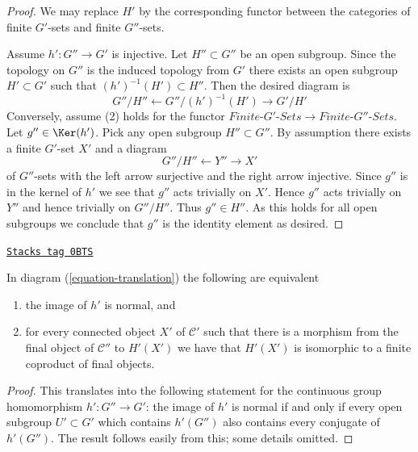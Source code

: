 \begin{proof}
We may replace $H'$ by the corresponding functor between the categories
of finite $G'$-sets and finite $G''$-sets.

\medskip\noindent
Assume $h' : G'' \to G'$ is injective. Let $H'' \subset G''$
be an open subgroup. Since the topology on $G''$ is the induced
topology from $G'$ there exists an open subgroup $H' \subset G'$
such that $(h')^{-1}(H') \subset H''$.
Then the desired diagram is
$$
G''/H'' \leftarrow G''/(h')^{-1}(H') \rightarrow G'/H'
$$
Conversely, assume (2) holds for the functor
$\textit{Finite-}G'\textit{-Sets} \to \textit{Finite-}G''\textit{-Sets}$.
Let $g'' \in \Ker(h')$. Pick any open subgroup $H'' \subset G''$.
By assumption there exists a finite $G'$-set $X'$ and a diagram
$$
G''/H'' \leftarrow Y'' \rightarrow X'
$$
of $G''$-sets with the left arrow surjective and the right arrow injective.
Since $g''$ is in the kernel of $h'$ we see that $g''$ acts trivially on $X'$.
Hence $g''$ acts trivially on $Y''$ and hence trivially on $G''/H''$.
Thus $g'' \in H''$. As this holds for all open subgroups we conclude
that $g''$ is the identity element as desired.
\end{proof}

\begin{lemma}
\label{pione-lemma-functoriality-galois-normal}
\href{https://stacks.math.columbia.edu/tag/0BTS}{\texttt{Stacks tag 0BTS}}

In diagram (\ref{equation-translation}) the following are equivalent
\begin{enumerate}
\item the image of $h'$ is normal, and
\item for every connected object $X'$ of $\mathcal{C}'$ such that
there is a morphism from the final object of $\mathcal{C}''$
to $H'(X')$ we have that $H'(X')$ is isomorphic to a finite coproduct
of final objects.
\end{enumerate}
\end{lemma}

\begin{proof}
This translates into the following statement for the continuous
group homomorphism $h' : G'' \to G'$: the image of $h'$ is normal
if and only if every open subgroup $U' \subset G'$ which
contains $h'(G'')$ also contains every conjugate of $h'(G'')$.
The result follows easily from this; some details omitted.
\end{proof}

